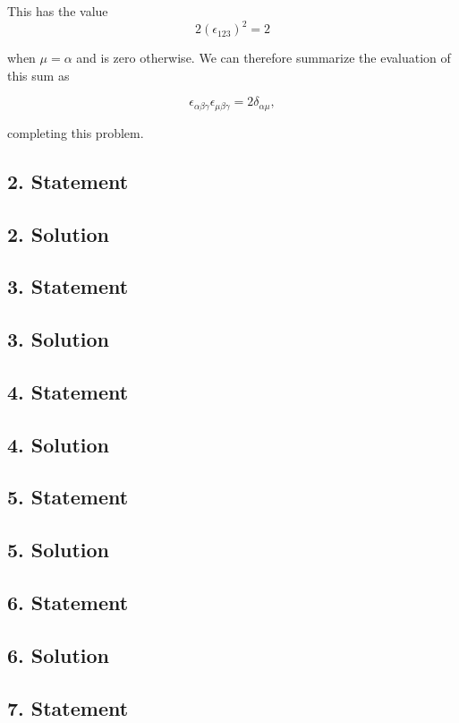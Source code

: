 This has the value
\begin{equation}\label{eqn:relElectroDynProblemSet3:n}
2 (\epsilon_{1 2 3})^2 = 2
\end{equation}

when $\mu = \alpha$ and is zero otherwise.  We can therefore summarize the evaluation of this sum as 

\begin{equation}\label{eqn:relElectroDynProblemSet3:n}
\epsilon_{\alpha \beta \gamma}
\epsilon_{\mu \beta \gamma}
=  2\delta_{\alpha\mu},
\end{equation}

completing this problem.

\subsection{2. Statement}
\subsection{2. Solution}
\subsection{3. Statement}
\subsection{3. Solution}
\subsection{4. Statement}
\subsection{4. Solution}
\subsection{5. Statement}
\subsection{5. Solution}
\subsection{6. Statement}
\subsection{6. Solution}
\subsection{7. Statement}
